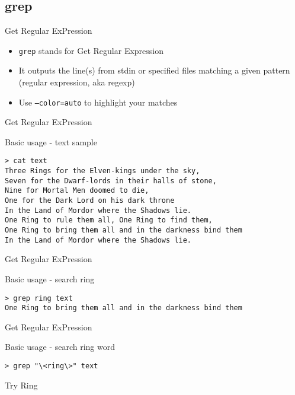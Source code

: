 \subsection{grep}
\begin{frame}[fragile]{Get Regular ExPression}
\begin{itemize}
  \item \texttt{grep} stands for Get Regular Expression
  \pause
  \item It outputs the line(s) from stdin or specified files matching a given pattern (regular expression, aka regexp)
  \pause
  \item Use \texttt{--color=auto} to highlight your matches
\end{itemize}
\end{frame}

\begin{frame}[fragile]{Get Regular ExPression}
  \begin{exampleblock}{Basic usage - text sample}
    \begin{lstlisting}[showstringspaces=false,basicstyle=\tiny]
> cat text
Three Rings for the Elven-kings under the sky,
Seven for the Dwarf-lords in their halls of stone,
Nine for Mortal Men doomed to die,
One for the Dark Lord on his dark throne
In the Land of Mordor where the Shadows lie.
One Ring to rule them all, One Ring to find them,
One Ring to bring them all and in the darkness bind them
In the Land of Mordor where the Shadows lie.
    \end{lstlisting}
  \end{exampleblock}
\end{frame}

\begin{frame}[fragile]{Get Regular ExPression}
  \begin{exampleblock}{Basic usage - search ring}
    \begin{lstlisting}[showstringspaces=false,basicstyle=\tiny]
> grep ring text
One Ring to bring them all and in the darkness bind them
    \end{lstlisting}
  \end{exampleblock}
\end{frame}


\begin{frame}[fragile]{Get Regular ExPression}
  \begin{exampleblock}{Basic usage - search ring word}
    \begin{lstlisting}[showstringspaces=false,basicstyle=\tiny]
> grep "\<ring\>" text
    \end{lstlisting}
  \end{exampleblock}
  \pause
  Try Ring
\end{frame}


